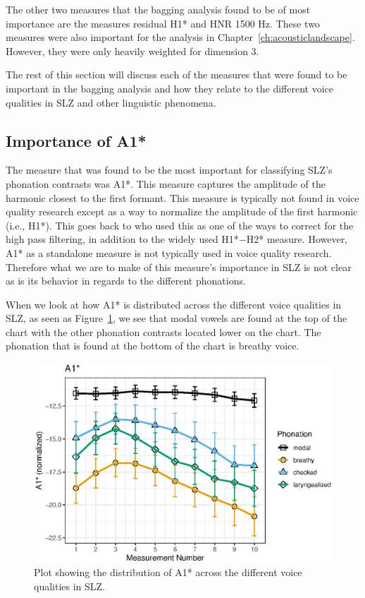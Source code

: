 The other two measures that the bagging analysis found to be of most importance are the measures residual H1* and HNR 1500 Hz. These two measures were also important for the analysis in Chapter~\ref{ch:acousticlandscape}. However, they were only heavily weighted for dimension 3. 

The rest of this section will discuss each of the measures that were found to be important in the bagging analysis and how they relate to the different voice qualities in SLZ and other linguistic phenomena. 

\subsection{Importance of A1*} \label{sec:bagging_a1}

The measure that was found to be the most important for classifying SLZ's phonation contrasts was A1*. This measure captures the amplitude of the harmonic closest to the first formant. This measure is typically not found in voice quality research except as a way to normalize the amplitude of the first harmonic (i.e., H1*). This goes back to \citet{fischer-jorgensenPhoneticAnalysisBreathy1968} who used this as one of the ways to correct for the high pass filtering, in addition to the widely used H1*$-$H2* measure. However, A1* as a standalone measure is not typically used in voice quality research. Therefore what we are to make of this measure's importance in SLZ is not clear as is its behavior in regards to the different phonations. 

When we look at how A1* is distributed across the different voice qualities in SLZ, as seen as Figure~\ref{fig:a1}, we see that modal vowels are found at the top of the chart with the other phonation contrasts located lower on the chart. The phonation that is found at the bottom of the chart is breathy voice. 
\begin{figure}[!ht]
    \centering
    \includegraphics[width = 0.9\linewidth]{images/slz_a1c.eps}
    \caption{Plot showing the distribution of A1* across the different voice qualities in SLZ.}
    \label{fig:a1}
\end{figure}

